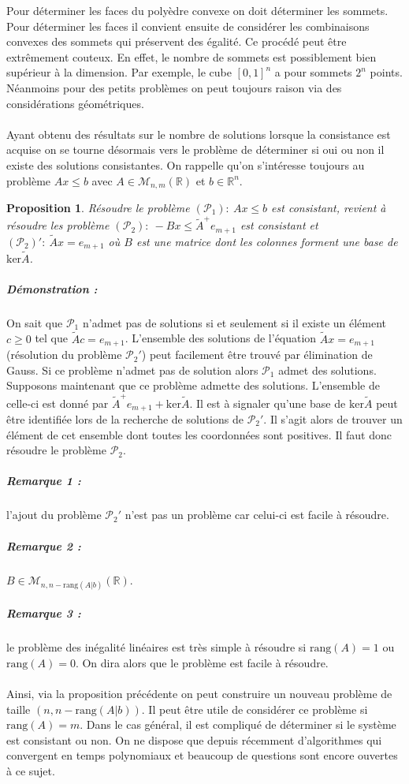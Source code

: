 \documentclass[10pt,a4paper]{article}
\newtheorem{prop}{Proposition}
\begin{document}
Pour déterminer les faces du polyèdre convexe on doit déterminer les sommets.
Pour déterminer les faces il convient ensuite de considérer les combinaisons convexes des sommets qui préservent des égalité.
Ce procédé peut être extrêmement couteux.
En effet, le nombre de sommets est possiblement bien supérieur à la dimension.
Par exemple, le cube $[0,1]^n$ a pour sommets $2^n$ points.
Néanmoins pour des petits problèmes on peut toujours raison via des considérations géométriques.\\
~\\
Ayant obtenu des résultats sur le nombre de solutions lorsque la consistance est acquise on se tourne désormais vers le problème de déterminer si oui ou non il existe des solutions consistantes.
On rappelle qu'on s'intéresse toujours au problème $Ax \le b$ avec $A \in \mathcal{M}_{n,m}(\mathbb{R})$ et $b \in \mathbb{R}^n$.
\begin{prop}
\label{propit}
Résoudre le problème $(\mathcal{P}_1): \ Ax \le b$ est consistant, revient à résoudre les problème $(\mathcal{P}_2): \ -Bx \le \tilde{A}^+ e_{m+1}$ est consistant et $(\mathcal{P}_2)' : \ \tilde{A} x=e_{m+1}$ où $B$ est une matrice dont les colonnes forment une base de $\text{ker}\tilde{A}$.
\end{prop}
\subparagraph{Démonstration :} On sait que $\mathcal{P}_1$ n'admet pas de solutions si et seulement si il existe un élément $c \ge 0$ tel que $\tilde{A}c=e_{m+1}$.
L'ensemble des solutions de l'équation $\tilde{A}x=e_{m+1}$ (résolution du problème $\mathcal{P}_2'$) peut facilement être trouvé par élimination de Gauss.
Si ce problème n'admet pas de solution alors $\mathcal{P}_1$ admet des solutions.
Supposons maintenant que ce problème admette des solutions.
L'ensemble de celle-ci est donné par $\tilde{A}^+e_{m+1}+\text{ker}\tilde{A}$.
Il est à signaler qu'une base de $\text{ker}\tilde{A}$ peut être identifiée lors de la recherche de solutions de $\mathcal{P}_2'$.
Il s'agit alors de trouver un élément de cet ensemble dont toutes les coordonnées sont positives.
Il faut donc résoudre le problème $\mathcal{P}_2$.\\
\subparagraph{Remarque 1 :} l'ajout du problème $\mathcal{P}_2'$ n'est pas un problème car celui-ci est facile à résoudre.
\subparagraph{Remarque 2 :} $B \in \mathcal{M}_{n,n-\text{rang}(A \vert b)}(\mathbb{R})$.
\subparagraph{Remarque 3 :} le problème des inégalité linéaires est très simple à résoudre si $\text{rang}(A)=1$ ou $\text{rang}(A)=0$.
On dira alors que le problème est facile à résoudre.\\
~\\
Ainsi, via la proposition précédente on peut construire un nouveau problème de taille $(n,n- \text{rang}(A \vert b))$.
Il peut être utile de considérer ce problème si $\text{rang}(A)=m$.
Dans le cas général, il est compliqué de déterminer si le système est consistant ou non.
On ne dispose que depuis récemment d'algorithmes qui convergent en temps polynomiaux et beaucoup de questions sont encore ouvertes à ce sujet.
\end{document}
